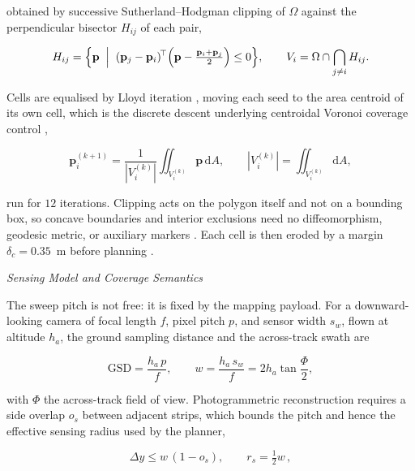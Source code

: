 \documentclass[10pt,letterpaper]{article}
\newcommand{\headingthree}[1]{%
    \par\vspace{6pt}%
    {\centering\fontsize{10}{12}\selectfont\itshape #1\par}%
    \vspace{2pt}\noindent\ignorespaces}
\newcommand{\cit}[1]{\cite{#1}}
\newcommand{\citt}[2]{\cite{#1,#2}}
\begin{document}
obtained by successive Sutherland--Hodgman clipping of $\Omega$ against the perpendicular
bisector $H_{ij}$ of each pair,

\begin{equation}
    \label{eq:e2}
    H_{ij}=\Bigl\{\mathbf{p} \;\Bigm|\;
    (\mathbf{p}_j-\mathbf{p}_i)^{\!\top}
    \Bigl(\mathbf{p}-\tfrac{\mathbf{p}_i+\mathbf{p}_j}{2}\Bigr)\le 0\Bigr\},
    \qquad V_i=\Omega\cap\bigcap_{j\neq i}H_{ij}.
\end{equation}

Cells are equalised by Lloyd iteration \cit{lloydLeastSquaresQuantization1982}, moving
each seed to the area centroid of its own cell, which is the discrete descent underlying
centroidal Voronoi coverage control
\citt{cortesCoverageControl2004}{duCentroidalVoronoiTessellations1999},

\begin{equation}
    \label{eq:e3}
    \mathbf{p}_i^{(k+1)}=\frac{1}{|V_i^{(k)}|}\iint_{V_i^{(k)}}\mathbf{p}\,\mathrm{d}A,
    \qquad
    |V_i^{(k)}|=\iint_{V_i^{(k)}}\mathrm{d}A,
\end{equation}

run for $12$ iterations. Clipping acts on the polygon itself and not on a bounding box,
so concave boundaries and interior exclusions need no diffeomorphism, geodesic metric, or
auxiliary markers \citt{leeAdaptiveCentroidalVoronoi2024}{breitenmoserVoronoiCoverage2010}. Each cell is then eroded by a margin
$\delta_c=0.35$~m before planning \cit{caoDistributedWeightedCoverage2023}.

\headingthree{Sensing Model and Coverage Semantics}

The sweep pitch is not free: it is fixed by the mapping payload. For a downward-looking
camera of focal length $f$, pixel pitch $p$, and sensor width $s_w$, flown at altitude
$h_a$, the ground sampling distance and the across-track swath are

\begin{equation}
    \mathrm{GSD}=\frac{h_a\,p}{f},
    \qquad
    w=\frac{h_a\,s_w}{f}=2h_a\tan\frac{\Phi}{2},
    \label{eq:gsd}
\end{equation}

with $\Phi$ the across-track field of view. Photogrammetric reconstruction requires a side
overlap $o_s$ between adjacent strips, which bounds the pitch and hence the effective
sensing radius used by the planner,

\begin{equation}
    \Delta y\le w\,(1-o_s),
    \qquad
    r_s=\tfrac{1}{2}w\,,
    \label{eq:pitch}
\end{equation}
\end{document}
